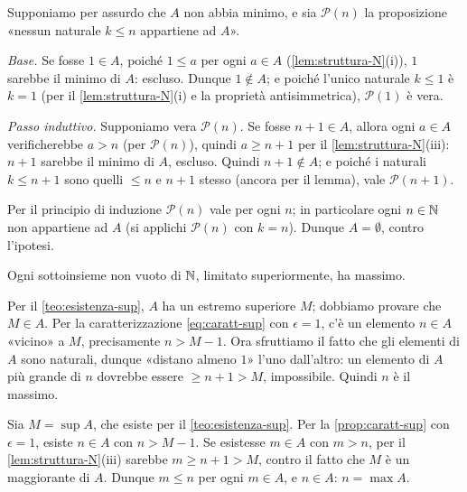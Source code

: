 \begin{dimostrazione}
Supponiamo per assurdo che $A$ non abbia minimo, e sia $\mathcal{P}(n)$ la proposizione
«nessun naturale $k\le n$ appartiene ad $A$».

\emph{Base.} Se fosse $1\in A$, poiché $1\le a$ per ogni $a\in A$ (\cref{lem:struttura-N}(i)),
$1$ sarebbe il minimo di $A$: escluso. Dunque $1\notin A$; e poiché l'unico naturale
$k\le1$ è $k=1$ (per il \cref{lem:struttura-N}(i) e la proprietà antisimmetrica),
$\mathcal{P}(1)$ è vera.

\emph{Passo induttivo.} Supponiamo vera $\mathcal{P}(n)$. Se fosse $n+1\in A$, allora
ogni $a\in A$ verificherebbe $a>n$ (per $\mathcal{P}(n)$), quindi $a\ge n+1$ per il
\cref{lem:struttura-N}(iii): $n+1$ sarebbe il minimo di $A$, escluso. Quindi
$n+1\notin A$; e poiché i naturali $k\le n+1$ sono quelli $\le n$ e $n+1$ stesso
(ancora per il lemma), vale $\mathcal{P}(n+1)$.

Per il principio di induzione $\mathcal{P}(n)$ vale per ogni $n$; in particolare ogni
$n\in\mathbb{N}$ non appartiene ad $A$ (si applichi $\mathcal{P}(n)$ con $k=n$). Dunque
$A=\emptyset$, contro l'ipotesi.
\end{dimostrazione}

\begin{teorema}\label{teo:max-N}
Ogni sottoinsieme non vuoto di $\mathbb{N}$, limitato superiormente, ha massimo.
\end{teorema}

\begin{schema}
\end{schema}

\begin{strategia}
Per il \cref{teo:esistenza-sup}, $A$ ha un estremo superiore $M$; dobbiamo provare che
$M\in A$. Per la caratterizzazione \eqref{eq:caratt-sup} con $\epsilon=1$, c'è un
elemento $n\in A$ «vicino» a $M$, precisamente $n>M-1$. Ora sfruttiamo il fatto che gli
elementi di $A$ sono naturali, dunque «distano almeno $1$» l'uno dall'altro: un elemento
di $A$ più grande di $n$ dovrebbe essere $\ge n+1>M$, impossibile. Quindi $n$ è il
massimo.
\end{strategia}

\begin{dimostrazione}
Sia $M=\sup A$, che esiste per il \cref{teo:esistenza-sup}. Per la
\cref{prop:caratt-sup} con $\epsilon=1$, esiste $n\in A$ con $n>M-1$. Se esistesse
$m\in A$ con $m>n$, per il \cref{lem:struttura-N}(iii) sarebbe $m\ge n+1>M$, contro il
fatto che $M$ è un maggiorante di $A$. Dunque $m\le n$ per ogni $m\in A$, e $n\in A$:
$n=\max A$.
\end{dimostrazione}

